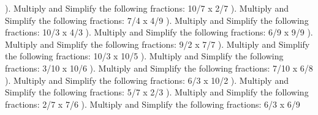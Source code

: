 \documentclass{article}%
\begin{document}
\newline%
\newline%
). Multiply and Simplify the following fractions: 10/7 x 2/7%
\newline%
\newline%
). Multiply and Simplify the following fractions: 7/4 x 4/9%
\newline%
\newline%
). Multiply and Simplify the following fractions: 10/3 x 4/3%
\newline%
\newline%
). Multiply and Simplify the following fractions: 6/9 x 9/9%
\newline%
\newline%
). Multiply and Simplify the following fractions: 9/2 x 7/7%
\newline%
\newline%
). Multiply and Simplify the following fractions: 10/3 x 10/5%
\newline%
\newline%
). Multiply and Simplify the following fractions: 3/10 x 10/6%
\newline%
\newline%
). Multiply and Simplify the following fractions: 7/10 x 6/8%
\newline%
\newline%
). Multiply and Simplify the following fractions: 6/3 x 10/2%
\newline%
\newline%
). Multiply and Simplify the following fractions: 5/7 x 2/3%
\newline%
\newline%
). Multiply and Simplify the following fractions: 2/7 x 7/6%
\newline%
\newline%
). Multiply and Simplify the following fractions: 6/3 x 6/9%
\newline%
\end{document}
